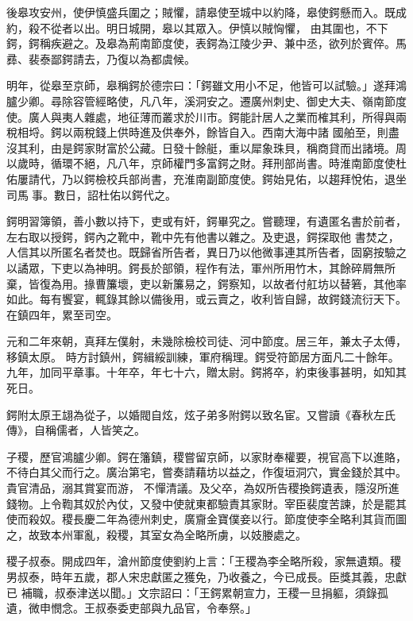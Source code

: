 \begin{pinyinscope}
 後皋攻安州，使伊慎盛兵圍之；賊懼，請皋使至城中以約降，皋使鍔懸而入。既成約，殺不從者以出。明日城開，皋以其眾入。伊慎以賊恟懼，
 由其圍也，不下鍔，鍔稱疾避之。及皋為荊南節度使，表鍔為江陵少尹、兼中丞，欲列於賓倅。馬彞、裴泰鄙鍔請去，乃復以為都虞候。



 明年，從皋至京師，皋稱鍔於德宗曰：「鍔雖文用小不足，他皆可以試驗。」遂拜鴻臚少卿。尋除容管經略使，凡八年，溪洞安之。遷廣州刺史、御史大夫、嶺南節度使。廣人與夷人雜處，地征薄而叢求於川市。鍔能計居人之業而榷其利，所得與兩稅相埒。鍔以兩稅錢上供時進及供奉外，餘皆自入。西南大海中諸
 國舶至，則盡沒其利，由是鍔家財富於公藏。日發十餘艇，重以犀象珠貝，稱商貸而出諸境。周以歲時，循環不絕，凡八年，京師權門多富鍔之財。拜刑部尚書。時淮南節度使杜佑屢請代，乃以鍔檢校兵部尚書，充淮南副節度使。鍔始見佑，以趨拜悅佑，退坐司馬事。數日，詔杜佑以鍔代之。



 鍔明習簿領，善小數以持下，吏或有奸，鍔畢究之。嘗聽理，有遺匿名書於前者，左右取以授鍔，鍔內之靴中，靴中先有他書以雜之。及吏退，鍔探取他
 書焚之，人信其以所匿名者焚也。既歸省所告者，異日乃以他微事連其所告者，固窮按驗之以譎眾，下吏以為神明。鍔長於部領，程作有法，軍州所用竹木，其餘碎屑無所棄，皆復為用。掾曹簾壞，吏以新簾易之，鍔察知，以故者付舡坊以替箬，其他率如此。每有饗宴，輒錄其餘以備後用，或云賣之，收利皆自歸，故鍔錢流衍天下。在鎮四年，累至司空。



 元和二年來朝，真拜左僕射，未幾除檢校司徒、河中節度。居三年，兼太子太傅，移鎮太原。
 時方討鎮州，鍔緝綏訓練，軍府稱理。鍔受符節居方面凡二十餘年。九年，加同平章事。十年卒，年七十六，贈太尉。鍔將卒，約束後事甚明，如知其死日。



 鍔附太原王翃為從子，以婚閥自炫，炫子弟多附鍔以致名宦。又嘗讀《春秋左氏傳》，自稱儒者，人皆笑之。



 子稷，歷官鴻臚少卿。鍔在籓鎮，稷嘗留京師，以家財奉權要，視官高下以進賂，不待白其父而行之。廣治第宅，嘗奏請藉坊以益之，作復垣洞穴，實金錢於其中。貴官清品，溺其賞宴而游，
 不憚清議。及父卒，為奴所告稷換鍔遺表，隱沒所進錢物。上令鞫其奴於內仗，又發中使就東都驗責其家財。宰臣裴度苦諫，於是罷其使而殺奴。稷長慶二年為德州刺史，廣齎金寶僕妾以行。節度使李全略利其貨而圖之，故致本州軍亂，殺稷，其室女為全略所虜，以妓媵處之。



 稷子叔泰。開成四年，滄州節度使劉約上言：「王稷為李全略所殺，家無遺類。稷男叔泰，時年五歲，郡人宋忠獻匿之獲免，乃收養之，今已成長。臣獎其義，忠獻已
 補職，叔泰津送以聞。」文宗詔曰：「王鍔累朝宣力，王稷一旦捐軀，須錄孤遺，微申憫念。王叔泰委吏部與九品官，令奉祭。」




\end{pinyinscope}
